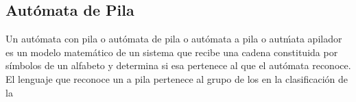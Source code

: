 \documentclass[12pt,a4paper,spanish]{book}
\begin{document}
\subsection{Aut\'omata de Pila}
Un aut\'omata con pila o aut\'omata de pila o aut\'omata a pila o aut\'mata apilador es un
modelo matem\'atico de un sistema que recibe una cadena constituida por s\'imbolos de un
alfabeto y determina si esa  pertenece al  que el aut\'omata reconoce. El
lenguaje que reconoce un  a pila pertenece al grupo de los  en la clasificaci\'on de la 
\end{document}
